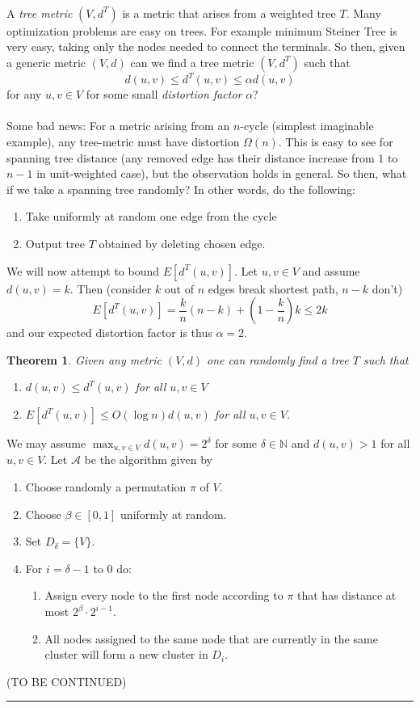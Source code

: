 \documentclass[letterpaper,12pt,oneside,onecolumn]{article}
\newcommand{\N}{\mathbb{N}} \newcommand{\R}{\mathbb{R}}
\newcommand{\cA}{\mathcal{A}} \newcommand{\cB}{\mathcal{B}}
\newenvironment{proof}{{\bf Proof:  }}{\hfill\rule{2mm}{2mm}}
\newtheorem{theorem}[fact]{Theorem}
\begin{document}
\paragraph{}
A {\it tree metric} $(V,d^T)$ is a metric that arises from a weighted tree $T$. Many optimization problems are easy on trees. For example minimum Steiner Tree is very easy, taking only the nodes needed to connect the terminals. So then, given a generic metric $(V,d)$ can we find a tree metric $(V,d^T)$ such that
$$d(u,v) \leq d^T(u,v) \leq \alpha d(u,v)$$
for any $u,v \in V$ for some small {\it distortion factor} $\alpha$?
\paragraph{}
Some bad news: For a metric arising from an $n$-cycle (simplest imaginable example), any tree-metric must have distortion $\Omega(n)$. This is easy to see for spanning tree distance (any removed edge has their distance increase from $1$ to $n-1$ in unit-weighted case), but the observation holds in general. So then, what if we take a spanning tree randomly? In other words, do the following:
\begin{enumerate}
\item Take uniformly at random one edge from the cycle
\item Output tree $T$ obtained by deleting chosen edge.
\end{enumerate}
We will now attempt to bound $E[d^T(u,v)]$. Let $u,v \in V$ and assume $d(u,v) = k$. Then (consider $k$ out of $n$ edges break shortest path, $n-k$ don't)
$$E[d^T(u,v)] = \frac{k}{n}(n-k) + (1-\frac{k}{n})k \leq 2k$$
and our expected distortion factor is thus $\alpha = 2$.
\begin{theorem}
Given any metric $(V,d)$ one can randomly find a tree $T$ such that
\begin{enumerate}
\item $d(u,v) \leq d^T(u,v)$ for all $u,v\in V$
\item $E[d^T(u,v)] \leq O(\log n) d(u,v)$ for all $u,v\in V$.
\end{enumerate}
\end{theorem}
\begin{proof}
We may assume $\max_{u,v \in V} d(u,v) = 2^\delta$ for some $\delta \in \N$ and $d(u,v) > 1$ for all $u,v\in V$. Let $\cA$ be the algorithm given by
\begin{enumerate}
\item Choose randomly a permutation $\pi$ of $V$.
\item Choose $\beta \in [0,1]$ uniformly at random.
\item Set $D_\delta = \{V\}$.
\item For $i = \delta -1$ to $0$ do:
\begin{enumerate}
\item Assign every node to the first node according to $\pi$ that has distance at most $2^\beta \cdot 2^{i-1}$.
\item All nodes assigned to the same node that are currently in the same cluster will form a new cluster in $D_i$.
\end{enumerate}
\end{enumerate}
(TO BE CONTINUED)
\end{proof}
\end{document}
